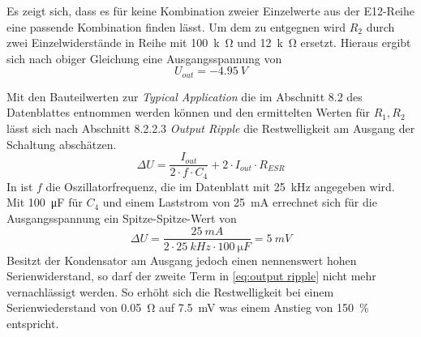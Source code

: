 	Es zeigt sich, dass es für keine Kombination zweier Einzelwerte aus der E12-Reihe eine passende Kombination finden lässt.
	Um dem zu entgegnen wird \(R_2\) durch zwei Einzelwiderstände in Reihe mit \SI{100}{k\ohm} und \SI{12}{k\ohm} ersetzt.
	Hieraus ergibt sich nach obiger Gleichung eine Ausgangsspannung von
	\begin{equation}
		U_{out} = \SI{-4,95}{V}
		\label{eq:ausgangsspannung theoretisch}
	\end{equation}\par\medskip
	Mit den Bauteilwerten zur \textit{Typical Application} die im Abschnitt 8.2 des Datenblattes entnommen werden können
	und den ermittelten Werten für \(R_1, R_2\) lässt sich nach Abschnitt 8.2.2.3 \textit{Output Ripple} die Restwelligkeit
	am Ausgang der Schaltung abschätzen.
	\begin{equation}
		\Delta U = \frac{I_{out}}{2\cdot f \cdot C_{4}} + 2 \cdot I_{out} \cdot R_{ESR}
		\label{eq:output ripple}
	\end{equation}
	In  ist \(f\) die Oszillatorfrequenz, die im Datenblatt mit \SI{25}{kHz} angegeben wird. Mit \SI{100}{\micro F}
	für \(C_4\) und einem Laststrom von \SI{25}{mA} errechnet sich für die Ausgangsspannung ein Spitze-Spitze-Wert von
	\begin{equation}
		\Delta U = \frac{\SI{25}{mA}}{2 \cdot \SI{25}{kHz} \cdot \SI{100}{\micro F}} = \SI{5}{mV}
	\end{equation}
	Besitzt der Kondensator am Ausgang jedoch einen nennenswert hohen Serienwiderstand, so darf der zweite Term in \cref{eq:output ripple}
	nicht mehr vernachlässigt werden. So erhöht sich die Restwelligkeit bei einem Serienwiederstand von \SI{0,05}{\ohm} auf
	\SI{7,5}{mV} was einem Anstieg von \SI{150}{\percent} entspricht.